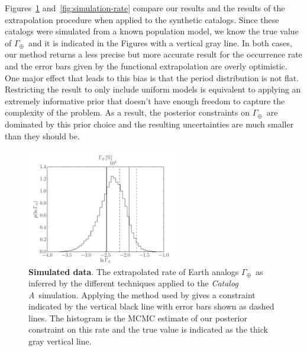 \documentclass[12pt,preprint]{aastex}
\newcommand{\figref}[1]{\ref{fig:#1}}
\newcommand{\figlabel}[1]{\label{fig:#1}}
\newcommand{\rate}{\ensuremath{\Gamma}}
\newcommand{\modela}{\emph{Catalog A}}
\newcommand{\gammaearth}{{\ensuremath{\rate_\oplus}}}
\begin{document}
Figures~\figref{smooth-rate} and~\figref{simulation-rate} compare our results
and the results of the \citet{petigura} extrapolation procedure when applied
to the synthetic catalogs.
Since these catalogs were simulated from a known population model, we know the
true value of \gammaearth\ and it is indicated in the Figures with a vertical
gray line.
In both cases, our method returns a less precise but more accurate result for
the occurrence rate and the error bars given by the functional extrapolation
are overly optimistic.
One major effect that leads to this bias is that the period distribution is
not flat.
Restricting the result to only include uniform models is equivalent to
applying an extremely informative prior that doesn't have enough freedom to
capture the complexity of the problem.
As a result, the posterior constraints on \gammaearth\ are dominated by this
prior choice and the resulting uncertainties are much smaller than they should
be.

\begin{figure}[p]
\begin{center}
\includegraphics[width=0.6\textwidth]{figures/smooth/rate.pdf}
\end{center}
\caption{%
{\bf Simulated data}.
The extrapolated rate of Earth analogs \gammaearth\ as inferred by the
different techniques applied to the \modela\ simulation.
Applying the method used by \citet{petigura} gives a constraint indicated by
the vertical black line with error bars shown as dashed lines.
The histogram is the MCMC estimate of our posterior constraint on this rate
and the true value is indicated as the thick gray vertical line.
\figlabel{smooth-rate}}
\end{figure}
\end{document}
